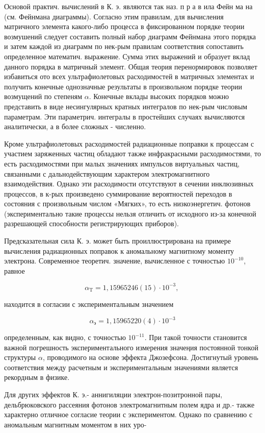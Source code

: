\documentclass[10pt]{article}
\begin{document}
Основой практич. вычислений в К. э. являются так наз. п р а в ила Фейн ма на (см. Фейнмана диаграммы). Согласно этим правилам, для вычисления матричного элемента какого-либо процесса в фиксированном порядке теории возмушений следует составить полный набор диаграмм Фейнмана этого порядка и затем каждой из диаграмм по нек-рым правилам соответствия сопоставить определенное математич. выражение. Сумма этих выражений и образует вклад данного порядка в матричный элемент. Общая теория перенормировок позволяет избавиться ото всех ультрафиолетовых расходимостей в матричных элементах и получить конечные однозначные результаты в произвольном порядке теории возмущений по степеням $\alpha$. Конечные вклады высоких порядков можно представить в виде несингулярных кратных интегралов по нек-рым числовым параметрам. Эти параметрич. интегралы в простейших случаях вычисляются аналитически, а в более сложных - численно.



Кроме ультрафиолетовых расходимостей радиационные поправки к процессам с участием заряженных частиц обладают также инфракрасными расходимостями, то есть расходимостями при малых значениях импульсов виртуальных частиц, связанными с дальнодействующим характером электромагнитного взаимодействия. Однако эти расходимости отсутствуют в сечении инклюзивных процессов, в к-рых произведено суммирование вероятностей переходов в состояния с произвольным числом «Мягких», то есть низкоэнергетич. фотонов (экспериментально такие процессы нельзя отличить от исходного из-за конечной разрешающей способности регистрирующих приборов).



Предсказательная сила К. э. может быть проиллюстрирована на примере вычисления радиационных поправок к аномальному магнитному моменту электрона. Современное теоретич. значение, вычисленное с точностью $10^{-10}$, равное



\[

\alpha_{\mathrm{T}}=1,15965246(15) \cdot 10^{-3} \text {, }

\]



находится в согласии с экспериментальным значением



\[

\alpha_{э}=1,15965220(4) \cdot 10^{-3}

\]



определенным, как видно, с точностью $10^{-11}$. При такой точности становится важной погрешность экспериментального измерения значеңия постоянной тонкой структуры $\alpha$, проводимого на основе эффекта Джозефсона. Достигнутый уровень соответствия между расчетным и экспериментальным значениями является рекордным в физике.



Для других эффектов К. э.- аннигиляции электрон-позитронной пары, дельбрюковского рассеяния фотонов электромагнитным полем ядра и др.- также характерно отличное согласие теории с экспериментом. Однако по сравнению с аномальным магнитным моментом в них уро-
\end{document}
